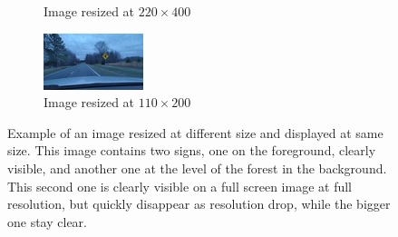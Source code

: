 \begin{figure}
\begin{center}
\begin{subfigure}[t]{.49\linewidth}
      \caption{Image resized at $220\times400$}
    \end{subfigure}
    \begin{subfigure}[t]{.49\linewidth}
      \centering
      \includegraphics[width=0.99\linewidth]{figures/im_example_110x200.jpg}
      \caption{Image resized at $110\times200$}
    \end{subfigure}
    \caption{Example of an image resized at different size and displayed at same size. This image contains two signs, one on the foreground, clearly visible, and another one at the level of the forest in the background. This second one is clearly visible on a full screen image at full resolution, but quickly disappear as resolution drop, while the bigger one stay clear.}
    \label{resizeExample}
  \end{center}
\end{figure}

